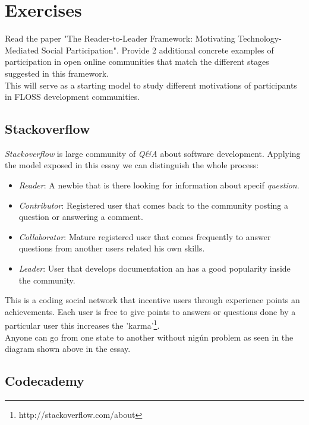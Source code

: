 \documentclass[11pt]{scrartcl}
\begin{document}
\section{Exercises}

    Read the paper "The Reader-to-Leader Framework: Motivating Technology-Mediated Social  Participation". Provide 2 additional concrete examples of participation in open online communities that match the different stages suggested in this framework.\\
    This will serve as a starting model to study different motivations of participants in FLOSS development communities.
    
    \subsection{Stackoverflow}
    
	\emph{Stackoverflow} is large community of \emph{Q\&A} about software development. Applying the model exposed in this essay we can distinguish the whole process:
	
	\begin{itemize}
	
		\item \emph{Reader}: A newbie that is there looking for information about specif \emph{question}.
		\item \emph{Contributor}: Registered user that comes back to the community posting a question or answering a comment.
		\item \emph{Collaborator}: Mature registered user that comes frequently to answer questions from another users related his own skills.
		\item \emph{Leader}: User that develops documentation an has a good popularity inside the community.
	\end{itemize}
	
	This is a coding social network that incentive users through experience points an achievements. Each user is free to give points to answers or questions done by a particular user this increases the 'karma'\footnote{http://stackoverflow.com/about}.\\
	Anyone can go from one state to another without nigún problem as seen in the diagram shown above in the essay.	

    \subsection{Codecademy}
    
\end{document}
